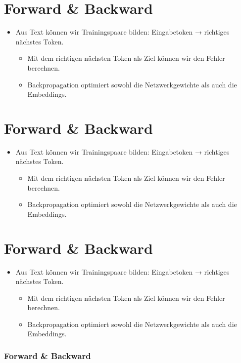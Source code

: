 \section{Forward \& Backward}

\begin{itemize}
\item Aus Text können wir Trainingspaare bilden: Eingabetoken → richtiges nächstes Token.
\begin{itemize}
\item Mit dem richtigen nächsten Token als Ziel können wir den Fehler berechnen.
\item Backpropagation optimiert sowohl die Netzwerkgewichte als auch die Embeddings.
\end{itemize}
\end{itemize}
\section{Forward \& Backward}

\begin{itemize}
\item Aus Text können wir Trainingspaare bilden: Eingabetoken → richtiges nächstes Token.
\begin{itemize}
\item Mit dem richtigen nächsten Token als Ziel können wir den Fehler berechnen.
\item Backpropagation optimiert sowohl die Netzwerkgewichte als auch die Embeddings.
\end{itemize}
\end{itemize}
\section{Forward \& Backward}

\begin{itemize}
\item Aus Text können wir Trainingspaare bilden: Eingabetoken → richtiges nächstes Token.
\begin{itemize}
\item Mit dem richtigen nächsten Token als Ziel können wir den Fehler berechnen.
\item Backpropagation optimiert sowohl die Netzwerkgewichte als auch die Embeddings.
\end{itemize}
\end{itemize}
\begin{frame}[t]
\frametitle{Forward \& Backward}

\end{frame}

